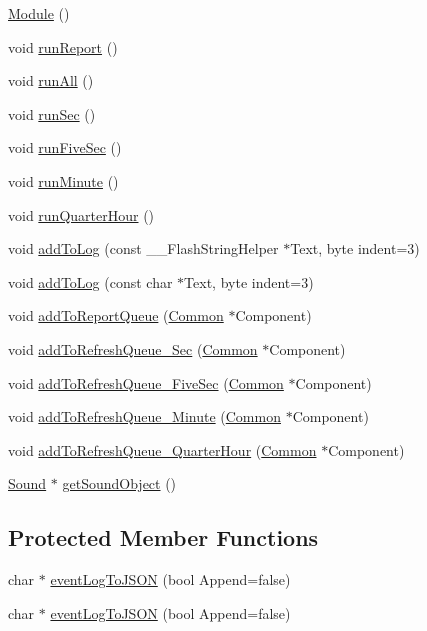 \begin{DoxyCompactItemize}
\item 
\hyperlink{class_module_a5a240a8a9ab1813b17bcb810b24ceaea}{Module} ()
\item 
void \hyperlink{class_module_ab66ea27e8ca0041539f6a563b455ab70}{run\+Report} ()
\item 
void \hyperlink{class_module_a7ed8e04ba630f6734ac15d06c4eae999}{run\+All} ()
\item 
void \hyperlink{class_module_ace01fc8566dc1d6367560d1ac61c2c18}{run\+Sec} ()
\item 
void \hyperlink{class_module_adb37fcc3cf7c1a693e5b6e92a873bf72}{run\+Five\+Sec} ()
\item 
void \hyperlink{class_module_aa13cfb83b001955abfeb3b87789a7ab8}{run\+Minute} ()
\item 
void \hyperlink{class_module_af56e1160074693aaa5699fafaae9d8be}{run\+Quarter\+Hour} ()
\item 
void \hyperlink{class_module_a5dfb18333a2943155a7fd6a4602e00a7}{add\+To\+Log} (const \+\_\+\+\_\+\+Flash\+String\+Helper $\ast$Text, byte indent=3)
\item 
void \hyperlink{class_module_a43676805f035e9640429667abdea07e6}{add\+To\+Log} (const char $\ast$Text, byte indent=3)
\item 
void \hyperlink{class_module_aee2cbab440d38d29948205820ad50be8}{add\+To\+Report\+Queue} (\hyperlink{class_common}{Common} $\ast$Component)
\item 
void \hyperlink{class_module_a08595d2a2bd347eec39c47a3b9e770fb}{add\+To\+Refresh\+Queue\+\_\+\+Sec} (\hyperlink{class_common}{Common} $\ast$Component)
\item 
void \hyperlink{class_module_a2dffaa526893d852b722cf890a6821c6}{add\+To\+Refresh\+Queue\+\_\+\+Five\+Sec} (\hyperlink{class_common}{Common} $\ast$Component)
\item 
void \hyperlink{class_module_a20d1125116f9a8c71339fde4626c5adb}{add\+To\+Refresh\+Queue\+\_\+\+Minute} (\hyperlink{class_common}{Common} $\ast$Component)
\item 
void \hyperlink{class_module_a25f5e60e0db8e157fee631928f745e82}{add\+To\+Refresh\+Queue\+\_\+\+Quarter\+Hour} (\hyperlink{class_common}{Common} $\ast$Component)
\item 
\hyperlink{class_sound}{Sound} $\ast$ \hyperlink{class_module_a173624381666c28f9d33e809f067711c}{get\+Sound\+Object} ()
\end{DoxyCompactItemize}
\subsection*{Protected Member Functions}
\begin{DoxyCompactItemize}
\item 
char $\ast$ \hyperlink{class_module_a3cb3b80bca51541305843ba3e6e7c5c1}{event\+Log\+To\+J\+S\+ON} (bool Append=false)
\item 
char $\ast$ \hyperlink{class_module_a2c92fb9e8e34856ebdea9d1ac1ad4e2b}{event\+Log\+To\+J\+S\+ON} (bool Append=false)
\end{DoxyCompactItemize}
